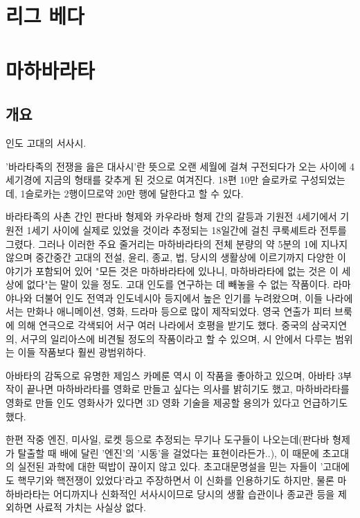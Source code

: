 \documentclass[12pt, a4paper, oneside]{book}
\let\stdsection\section
\renewcommand\section{\newpage\stdsection}
\begin{document}
\section{리그 베다}















\section{마하바라타}

\subsection{개요} 
인도 고대의 서사시.

'바라타족의 전쟁을 읊은 대사시’란 뜻으로 오랜 세월에 걸쳐 구전되다가 오는 사이에 4세기경에 지금의 형태를 갖추게 된 것으로 여겨진다. 
18편 10만 슬로카로 구성되었는데, 1슬로카는 2행이므로약 20만 행에 달한다고 할 수 있다.

바라타족의 사촌 간인 판다바 형제와 카우라바 형제 간의 갈등과 기원전 4세기에서 기원전 1세기 사이에 실제로 있었을 것이라 추정되는 18일간에 걸친 쿠룩셰트라 전투를 그렸다. 그러나 이러한 주요 줄거리는 마하바라타의 전체 분량의 약 5분의 1에 지나지 않으며 중간중간 고대의 전설, 윤리, 종교, 법, 당시의 생활상에 이르기까지 다양한 이야기가 포함되어 있어 "모든 것은 마하바라타에 있나니, 마하바라타에 없는 것은 이 세상에 없다"는 말이 있을 정도. 
고대 인도를 연구하는 데 빼놓을 수 없는 작품이다. 
라마야나와 더불어 인도 전역과 인도네시아 등지에서 높은 인기를 누려왔으며, 이들 나라에서는 만화나 애니메이션, 영화, 드라마 등으로 많이 제작되었다. 
영국 연출가 피터 브룩에 의해 연극으로 각색되어 서구 여러 나라에서 호평을 받기도 했다. 
중국의 삼국지연의, 서구의 일리아스에 비견될 정도의 작품이라고 할 수 있으며, 시 안에서 다루는 범위는 이들 작품보다 훨씬 광범위하다. 

아바타의 감독으로 유명한 제임스 카메룬 역시 이 작품을 좋아하고 있으며, 아바타 3부작이 끝나면 마하바라타를 영화로 만들고 싶다는 의사를 밝히기도 했고, 마하바라타를 영화로 만들 인도 영화사가 있다면 3D 영화 기술을 제공할 용의가 있다고 언급하기도 했다.

한편 작중 엔진, 미사일, 로켓 등으로 추정되는 무기나 도구들이 나오는데(판다바 형제가 탈출할 때 배에 달린 '엔진'의 '시동'을 걸었다는 표현이라든가..), 이 때문에 초고대의 실전된 과학에 대한 떡밥이 끊이지 않고 있다. 초고대문명설을 믿는 자들이 '고대에도 핵무기와 핵전쟁이 있었다'라고 주장하면서 이 신화를 인용하기도 하지만, 물론 마하바라타는 어디까지나 신화적인 서사시이므로 당시의 생활 습관이나 종교관 등을 제외하면 사료적 가치는 사실상 없다.
\end{document}
